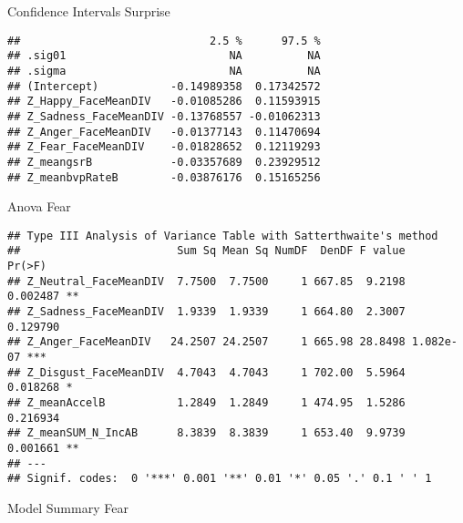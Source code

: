 \documentclass[
]{article}
\begin{document}
Confidence Intervals Surprise

\begin{verbatim}
##                             2.5 %      97.5 %
## .sig01                         NA          NA
## .sigma                         NA          NA
## (Intercept)           -0.14989358  0.17342572
## Z_Happy_FaceMeanDIV   -0.01085286  0.11593915
## Z_Sadness_FaceMeanDIV -0.13768557 -0.01062313
## Z_Anger_FaceMeanDIV   -0.01377143  0.11470694
## Z_Fear_FaceMeanDIV    -0.01828652  0.12119293
## Z_meangsrB            -0.03357689  0.23929512
## Z_meanbvpRateB        -0.03876176  0.15165256
\end{verbatim}

Anova Fear

\begin{verbatim}
## Type III Analysis of Variance Table with Satterthwaite's method
##                        Sum Sq Mean Sq NumDF  DenDF F value    Pr(>F)    
## Z_Neutral_FaceMeanDIV  7.7500  7.7500     1 667.85  9.2198  0.002487 ** 
## Z_Sadness_FaceMeanDIV  1.9339  1.9339     1 664.80  2.3007  0.129790    
## Z_Anger_FaceMeanDIV   24.2507 24.2507     1 665.98 28.8498 1.082e-07 ***
## Z_Disgust_FaceMeanDIV  4.7043  4.7043     1 702.00  5.5964  0.018268 *  
## Z_meanAccelB           1.2849  1.2849     1 474.95  1.5286  0.216934    
## Z_meanSUM_N_IncAB      8.3839  8.3839     1 653.40  9.9739  0.001661 ** 
## ---
## Signif. codes:  0 '***' 0.001 '**' 0.01 '*' 0.05 '.' 0.1 ' ' 1
\end{verbatim}

Model Summary Fear
\end{document}
